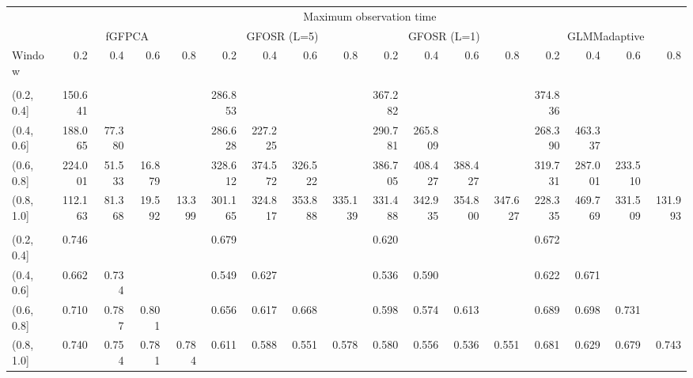 \documentclass[
]{article}
\begin{document}
\begin{landscape}\begin{table}
\centering
\begin{tabular}{lrrrrrrrrrrrrrrrr}
\toprule
\multicolumn{1}{c}{ } & \multicolumn{16}{c}{Maximum observation time} \\
\cmidrule(l{3pt}r{3pt}){2-17}
\multicolumn{1}{c}{ } & \multicolumn{4}{c}{fGFPCA} & \multicolumn{4}{c}{GFOSR (L=5)} & \multicolumn{4}{c}{GFOSR (L=1)} & \multicolumn{4}{c}{GLMMadaptive} \\
\cmidrule(l{3pt}r{3pt}){2-5} \cmidrule(l{3pt}r{3pt}){6-9} \cmidrule(l{3pt}r{3pt}){10-13} \cmidrule(l{3pt}r{3pt}){14-17}
Window & 0.2 & 0.4 & 0.6 & 0.8 & 0.2 & 0.4 & 0.6 & 0.8 & 0.2 & 0.4 & 0.6 & 0.8 & 0.2 & 0.4 & 0.6 & 0.8\\
\midrule
\addlinespace[0.3em]
\multicolumn{17}{l}{\textbf{ISE}}\\
\hspace{1em}(0.2, 0.4] & 150.641 &  &  &  & 286.853 &  &  &  & 367.282 &  &  &  & 374.836 &  &  & \\
\hspace{1em}(0.4, 0.6] & 188.065 & 77.380 &  &  & 286.628 & 227.225 &  &  & 290.781 & 265.809 &  &  & 268.390 & 463.337 &  & \\
\hspace{1em}(0.6, 0.8] & 224.001 & 51.533 & 16.879 &  & 328.612 & 374.572 & 326.522 &  & 386.705 & 408.427 & 388.427 &  & 319.731 & 287.001 & 233.510 & \\
\hspace{1em}(0.8, 1.0] & 112.163 & 81.368 & 19.592 & 13.399 & 301.165 & 324.817 & 353.888 & 335.139 & 331.488 & 342.935 & 354.800 & 347.627 & 228.335 & 469.769 & 331.509 & 131.993\\
\addlinespace[0.3em]
\multicolumn{17}{l}{\textbf{AUC}}\\
\hspace{1em}(0.2, 0.4] & 0.746 &  &  &  & 0.679 &  &  &  & 0.620 &  &  &  & 0.672 &  &  & \\
\hspace{1em}(0.4, 0.6] & 0.662 & 0.734 &  &  & 0.549 & 0.627 &  &  & 0.536 & 0.590 &  &  & 0.622 & 0.671 &  & \\
\hspace{1em}(0.6, 0.8] & 0.710 & 0.787 & 0.801 &  & 0.656 & 0.617 & 0.668 &  & 0.598 & 0.574 & 0.613 &  & 0.689 & 0.698 & 0.731 & \\
\hspace{1em}(0.8, 1.0] & 0.740 & 0.754 & 0.781 & 0.784 & 0.611 & 0.588 & 0.551 & 0.578 & 0.580 & 0.556 & 0.536 & 0.551 & 0.681 & 0.629 & 0.679 & 0.743\\
\bottomrule
\end{tabular}
\end{table}
\end{landscape}
\end{document}
